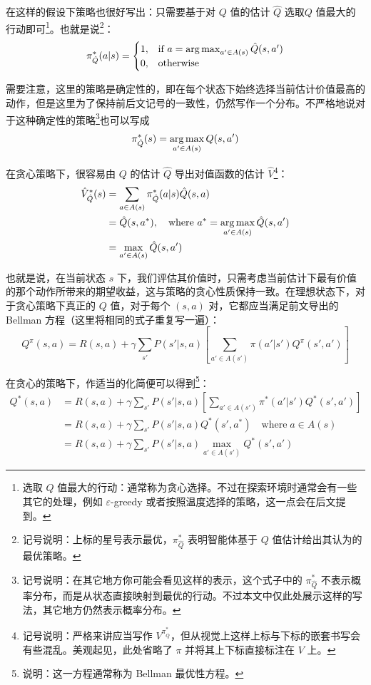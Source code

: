 在这样的假设下策略也很好写出：只需要基于对 $Q$ 值的估计 $\hat Q$ 选取$Q$ 值最大的行动即可\footnote{选取 $Q$ 值最大的行动：通常称为贪心选择。不过在探索环境时通常会有一些其它的处理，例如 $\varepsilon$-greedy 或者按照温度选择的策略，这一点会在后文提到。}。也就是说\footnote{记号说明：上标的星号表示最优，$\pi^*_{\hat Q}$ 表明智能体基于 $Q$ 值估计给出其认为的最优策略。}：
\[
    \pi^*_{\hat Q} (a | s) = \begin{cases}
        1, & \text{if } a = \operatorname*{arg\,max}_{a' \in A(s)} \hat Q(s, a') \\
        0, & \text{otherwise}
    \end{cases}
\]

需要注意，这里的策略是确定性的，即在每个状态下始终选择当前估计价值最高的动作，但是这里为了保持前后文记号的一致性，仍然写作一个分布。不严格地说对于这种确定性的策略\footnote{记号说明：在其它地方你可能会看见这样的表示，这个式子中的 $\pi^*_{\hat Q}$ 不表示概率分布，而是从状态直接映射到最优的行动。不过本文中仅此处展示这样的写法，其它地方仍然表示概率分布。}也可以写成
\[
    \pi^*_{\hat Q} (s) = \operatorname*{arg\,max}_{a' \in A(s)} Q(s, a')
\]

在贪心策略下，很容易由 $Q$ 的估计 $\hat Q$ 导出对值函数的估计 $\hat V$\footnote{记号说明：严格来讲应当写作 $V^{\pi^*_{\hat Q}}$，但从视觉上这样上标与下标的嵌套书写会有些混乱。美观起见，此处省略了 $\pi$ 并将其上下标直接标注在 $V$ 上。}：
\[
\begin{aligned}
    \hat V^*_{\hat Q} (s) &= \sum_{a \in A(s)} \pi^*_{\hat Q} (a | s) \hat Q(s, a) \\
    &= \hat Q(s, a^*), \quad \text{where } a^* = \operatorname*{arg\,max}_{a' \in A(s)} \hat Q(s, a') \\
    &= \max_{a' \in A(s)} \hat Q(s, a')
\end{aligned}
\]

也就是说，在当前状态 $s$ 下，我们评估其价值时，只需考虑当前估计下最有价值的那个动作所带来的期望收益，这与策略的贪心性质保持一致。在理想状态下，对于贪心策略下真正的 $Q$ 值，对于每个 $(s, a)$ 对，它都应当满足前文导出的 Bellman 方程（这里将相同的式子重复写一遍）：
\[
    Q^\pi (s, a) = R(s, a) + \gamma \sum_{s'} P(s' | s, a) \left[\sum_{a' \in A(s')} \pi(a' | s') Q^\pi (s', a')\right]
\]

在贪心的策略下，作适当的化简便可以得到\footnote{说明：这一方程通常称为 Bellman 最优性方程。}：
\[
\begin{aligned}
    Q^* (s, a) &= R(s, a) + \gamma \sum_{s'} P(s' | s, a) \left[
        \sum_{a' \in A(s')} \pi^* (a' | s') Q^* (s', a')
    \right] \\
    &= R(s, a) + \gamma \sum_{s'} P(s' | s, a) Q^* (s', a^*) \quad \text{where} \; a \in A(s)\\
    &= R(s, a) + \gamma \sum_{s'} P(s' | s, a) \max_{a' \in A(s')} Q^* (s', a')
\end{aligned}
\]

